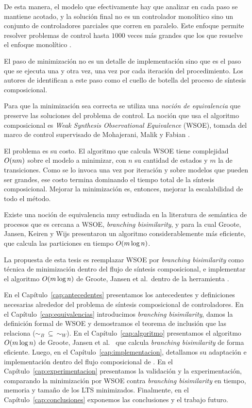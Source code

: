 De esta manera, el modelo que efectivamente hay que analizar en cada paso se mantiene acotado, y la solución final no es un controlador monolítico sino un conjunto de controladores parciales que corren en paralelo. Este enfoque permite resolver problemas de control hasta $1000$ veces más grandes que los que resuelve el enfoque monolítico \cite{compositional}.

El paso de minimización no es un detalle de implementación sino que es el paso que se ejecuta una y otra vez, una vez por cada iteración del procedimiento. Los autores de  \cite{compositional} identifican a este paso como el cuello de botella del proceso de síntesis composicional.

Para que la minimización sea correcta se utiliza una \textit{noción de equivalencia} que preserve las soluciones del problema de control. La noción que usa el algoritmo composicional es \textit{Weak Synthesis Observational Equivalence} (WSOE), tomada del marco de control supervisado de Mohajerani, Malik y Fabian \cite{wsoe}.

El problema es su costo. El algoritmo que calcula WSOE tiene complejidad ${O\!\left(nm\right)}$ sobre el modelo a minimizar, con $n$ su cantidad de estados y $m$ la de transiciones. Como se lo invoca una vez por iteración y sobre modelos que pueden ser grandes, ese costo termina dominando el tiempo total de la síntesis composicional. Mejorar la minimización es, entonces, mejorar la escalabilidad de todo el método.

Existe una noción de equivalencia muy estudiada en la literatura de semántica de procesos que es cercana a WSOE, \textit{branching bisimilarity}, y para la cual Groote, Jansen, Keiren y Wijs \cite{groote2019} presentaron un algoritmo considerablemente más eficiente, que calcula las particiones en tiempo ${O\!\left(m \log n\right)}$. 

La propuesta de esta tesis es reemplazar WSOE por \textit{branching bisimilarity} como técnica de minimización dentro del flujo de síntesis composicional, e implementar el algoritmo ${O\!\left(m \log n\right)}$ de Groote, Jansen et al.\ dentro de la herramienta \MTSA{} \cite{mtsa}.

En el Capítulo~\ref{cap:antecedentes} presentamos los antecedentes y definiciones necesarias alrededor del problema de síntesis composicional de controladores. En el Capítulo~\ref{cap:equivalencias} introducimos \textit{branching bisimilarity}, damos la definición formal de WSOE y demostramos el teorema de inclusión que las relaciona ($\sim_{B}\ \subseteq\ \sim_{W}$).  En el Capítulo~\ref{cap:algoritmo} presentamos el algoritmo ${O\!\left(m \log n\right)}$ de Groote, Jansen et al.\ \cite{groote2019} que calcula \textit{branching bisimilarity} de forma eficiente. Luego, en el Capítulo~\ref{cap:implementacion}, detallamos su adaptación e implementación dentro del flujo composicional de \MTSA{} \cite{mtsa}. En el Capítulo~\ref{cap:experimentacion} presentamos la validación y la experimentación, comparando la minimización por WSOE contra \textit{branching bisimilarity} en tiempo, memoria y tamaño de los LTS minimizados. Finalmente, en el Capítulo~\ref{cap:conclusiones} exponemos las conclusiones y el trabajo futuro.
